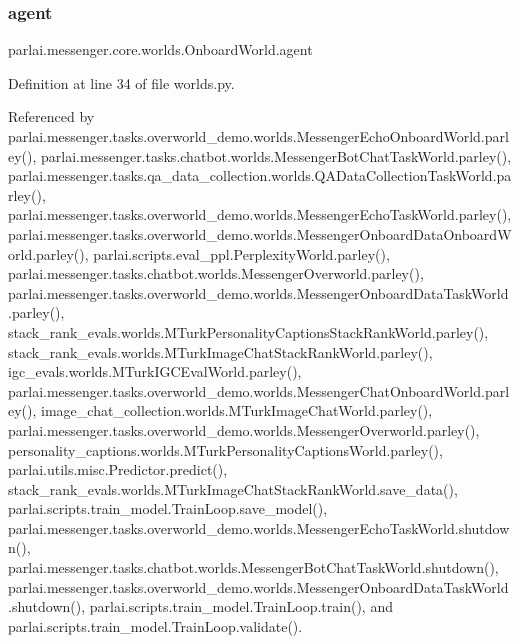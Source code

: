 \subsubsection{\texorpdfstring{agent}{agent}}
{\footnotesize\ttfamily parlai.\+messenger.\+core.\+worlds.\+Onboard\+World.\+agent}



Definition at line 34 of file worlds.\+py.



Referenced by parlai.\+messenger.\+tasks.\+overworld\+\_\+demo.\+worlds.\+Messenger\+Echo\+Onboard\+World.\+parley(), parlai.\+messenger.\+tasks.\+chatbot.\+worlds.\+Messenger\+Bot\+Chat\+Task\+World.\+parley(), parlai.\+messenger.\+tasks.\+qa\+\_\+data\+\_\+collection.\+worlds.\+Q\+A\+Data\+Collection\+Task\+World.\+parley(), parlai.\+messenger.\+tasks.\+overworld\+\_\+demo.\+worlds.\+Messenger\+Echo\+Task\+World.\+parley(), parlai.\+messenger.\+tasks.\+overworld\+\_\+demo.\+worlds.\+Messenger\+Onboard\+Data\+Onboard\+World.\+parley(), parlai.\+scripts.\+eval\+\_\+ppl.\+Perplexity\+World.\+parley(), parlai.\+messenger.\+tasks.\+chatbot.\+worlds.\+Messenger\+Overworld.\+parley(), parlai.\+messenger.\+tasks.\+overworld\+\_\+demo.\+worlds.\+Messenger\+Onboard\+Data\+Task\+World.\+parley(), stack\+\_\+rank\+\_\+evals.\+worlds.\+M\+Turk\+Personality\+Captions\+Stack\+Rank\+World.\+parley(), stack\+\_\+rank\+\_\+evals.\+worlds.\+M\+Turk\+Image\+Chat\+Stack\+Rank\+World.\+parley(), igc\+\_\+evals.\+worlds.\+M\+Turk\+I\+G\+C\+Eval\+World.\+parley(), parlai.\+messenger.\+tasks.\+overworld\+\_\+demo.\+worlds.\+Messenger\+Chat\+Onboard\+World.\+parley(), image\+\_\+chat\+\_\+collection.\+worlds.\+M\+Turk\+Image\+Chat\+World.\+parley(), parlai.\+messenger.\+tasks.\+overworld\+\_\+demo.\+worlds.\+Messenger\+Overworld.\+parley(), personality\+\_\+captions.\+worlds.\+M\+Turk\+Personality\+Captions\+World.\+parley(), parlai.\+utils.\+misc.\+Predictor.\+predict(), stack\+\_\+rank\+\_\+evals.\+worlds.\+M\+Turk\+Image\+Chat\+Stack\+Rank\+World.\+save\+\_\+data(), parlai.\+scripts.\+train\+\_\+model.\+Train\+Loop.\+save\+\_\+model(), parlai.\+messenger.\+tasks.\+overworld\+\_\+demo.\+worlds.\+Messenger\+Echo\+Task\+World.\+shutdown(), parlai.\+messenger.\+tasks.\+chatbot.\+worlds.\+Messenger\+Bot\+Chat\+Task\+World.\+shutdown(), parlai.\+messenger.\+tasks.\+overworld\+\_\+demo.\+worlds.\+Messenger\+Onboard\+Data\+Task\+World.\+shutdown(), parlai.\+scripts.\+train\+\_\+model.\+Train\+Loop.\+train(), and parlai.\+scripts.\+train\+\_\+model.\+Train\+Loop.\+validate().

